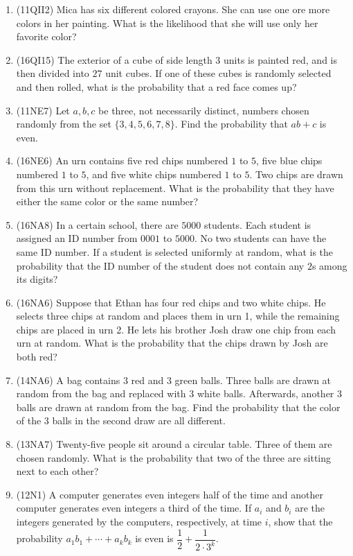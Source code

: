 \documentclass[10pt,paper=letter]{scrartcl}
\begin{document}
\begin{enumerate}

\item (11QII2) Mica has six different colored crayons. She can use one ore more colors in her painting. What is the likelihood that she will use only her favorite color?

\item (16QI15) The exterior of a cube of side length $3$ units is painted red, and is then divided into $27$ unit cubes. If one of these cubes is randomly selected and then rolled, what is the probability that a red face comes up?

\item (11NE7) Let $a, b, c$ be three, not necessarily distinct, numbers chosen randomly from the set $\{3, 4, 5, 6, 7, 8\}.$ Find the probability that $ab + c$ is even.

\item (16NE6) An urn contains five red chips numbered $1$ to $5$, five blue chips numbered $1$ to $5$, and five white chips numbered $1$ to $5$. Two chips are drawn from this urn without replacement. What is the probability that they have either the same color or the same number?

\item (16NA8) In a certain school, there are $5000$ students. Each student is assigned an ID number from $0001$ to $5000$. No two students can have the same ID number. If a student is selected uniformly at random, what is the probability that the ID number of the student does not contain any $2$s among its digits?

\item (16NA6) Suppose that Ethan has four red chips and two white chips. He selects three chips at random and places them in urn 1, while the remaining chips are placed in urn 2. He lets his brother Josh draw one chip from each urn at random. What is the probability that the chips drawn by Josh are both red?

\item (14NA6) A bag contains $3$ red and $3$ green balls. Three balls are drawn at random from the bag and replaced with $3$ white balls. Afterwards, another $3$ balls are drawn at random from the bag. Find the probability that the color of the $3$ balls in the second draw are all different.

\item (13NA7) Twenty-five people sit around a circular table. Three of them are chosen randomly. What is the probability that two of the three are sitting next to each other?

\item (12N1) A computer generates even integers half of the time and another computer generates even integers a third of the time. If $a_i$ and $b_i$ are the integers generated by the computers, respectively, at time $i$, show that the probability $a_1b_1 + \cdots + a_kb_k$ is even is $\dfrac{1}{2} + \dfrac{1}{2 \cdot 3^k}$.

\end{enumerate}
\end{document}
